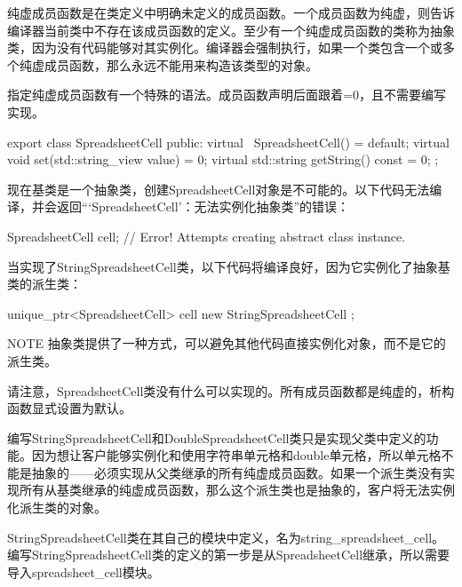
纯虚成员函数是在类定义中明确未定义的成员函数。一个成员函数为纯虚，则告诉编译器当前类中不存在该成员函数的定义。至少有一个纯虚成员函数的类称为抽象类，因为没有代码能够对其实例化。编译器会强制执行，如果一个类包含一个或多个纯虚成员函数，那么永远不能用来构造该类型的对象。

指定纯虚成员函数有一个特殊的语法。成员函数声明后面跟着=0，且不需要编写实现。

\begin{cpp}
export class SpreadsheetCell
{
    public:
        virtual ~SpreadsheetCell() = default;
        virtual void set(std::string_view value) = 0;
        virtual std::string getString() const = 0;
};
\end{cpp}

现在基类是一个抽象类，创建SpreadsheetCell对象是不可能的。以下代码无法编译，并会返回“‘SpreadsheetCell’：无法实例化抽象类”的错误：

\begin{cpp}
SpreadsheetCell cell; // Error! Attempts creating abstract class instance.
\end{cpp}

当实现了StringSpreadsheetCell类，以下代码将编译良好，因为它实例化了抽象基类的派生类：

\begin{cpp}
unique_ptr<SpreadsheetCell> cell { new StringSpreadsheetCell {} };
\end{cpp}

\begin{myNotic}{NOTE}
抽象类提供了一种方式，可以避免其他代码直接实例化对象，而不是它的派生类。
\end{myNotic}

请注意，SpreadsheetCell类没有什么可以实现的。所有成员函数都是纯虚的，析构函数显式设置为默认。


编写StringSpreadsheetCell和DoubleSpreadsheetCell类只是实现父类中定义的功能。因为想让客户能够实例化和使用字符串单元格和double单元格，所以单元格不能是抽象的——必须实现从父类继承的所有纯虚成员函数。如果一个派生类没有实现所有从基类继承的纯虚成员函数，那么这个派生类也是抽象的，客户将无法实例化派生类的对象。


StringSpreadsheetCell类在其自己的模块中定义，名为string\_spreadsheet\_cell。编写StringSpreadsheetCell类的定义的第一步是从SpreadsheetCell继承，所以需要导入spreadsheet\_cell模块。

